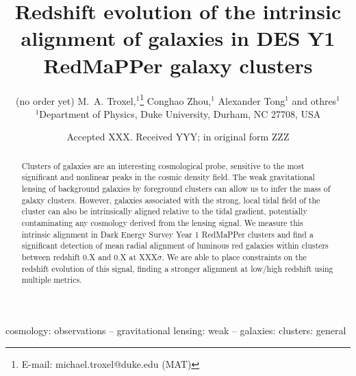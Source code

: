 \documentclass[fleqn,usenatbib]{mnras}
\title[Intrinsic alignment in DES Y1 redMaPPer clusters]{Redshift evolution of the intrinsic alignment of galaxies in DES Y1 RedMaPPer galaxy clusters}
\author[K. T. Smith et al.]{
(no order yet) M.~A. Troxel,$^{1}$\thanks{E-mail: michael.troxel@duke.edu (MAT)}
Conghao Zhou,$^{1}$
Alexander Tong$^{1}$
and othres$^{1}$
\\
$^{1}$Department of Physics, Duke University, Durham, NC 27708, USA\\
}
\date{Accepted XXX. Received YYY; in original form ZZZ}
\begin{document}
\label{firstpage}
\pagerange{\pageref{firstpage}--\pageref{lastpage}}
\maketitle

\begin{abstract}
Clusters of galaxies are an interesting cosmological probe, sensitive to the most significant and nonlinear peaks in the cosmic density field. The weak gravitational lensing of background galaxies by foreground clusters can allow us to infer the mass of galaxy clusters. However, galaxies associated with the strong, local tidal field of the cluster can also be intrinsically aligned relative to the tidal gradient, potentially contaminating any cosmology derived from the lensing signal. We measure this intrinsic alignment in Dark Energy Survey Year 1 RedMaPPer clusters and find a significant detection of mean radial alignment of luminous red galaxies within clusters between redshift 0.X and 0.X at XXX$\sigma$. We are able to place constraints on the redshift evolution of this signal, finding a stronger alignment at low/high redshift using multiple metrics.
\end{abstract}

\begin{keywords}
cosmology: observations -- gravitational lensing: weak -- galaxies: clusters: general 
\end{keywords}






\end{document}
